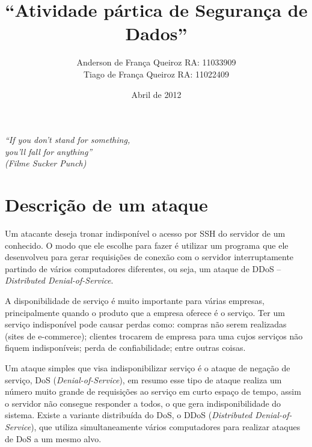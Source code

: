 \documentclass[12pt]{abnt}
\title{``Atividade pártica de Segurança de Dados''}
\author{Anderson de França Queiroz RA: 11033909\\
Tiago de França Queiroz RA: 11022409}
\date{Abril de 2012}
\begin{document}
\sloppy

\maketitle

\begin{titlepage}

  \vspace{6cm}

  \begin{flushleft}
    \sffamily\slshape
    ``If you don't stand for something,\\
	you'll fall for anything''\\
	(Filme Sucker Punch)
   
    \vspace{1cm}
    
    \end{flushleft}

\end{titlepage}

\tableofcontents
\clearpage

\chapter{Descrição de um ataque}

Um atacante deseja tronar indisponível o acesso por SSH do servidor de um conhecido. O modo que ele escolhe para fazer é utilizar
um programa que ele desenvolveu para gerar requisições de conexão com o servidor interruptamente partindo de vários computadores
diferentes, ou seja, um ataque de DDoS -- \textit{Distributed Denial-of-Service}.


A disponibilidade de serviço é muito importante para várias empresas, principalmente quando o produto que a empresa oferece é o serviço.
Ter um serviço indisponível pode causar perdas como: compras não serem realizadas (sites de e-commerce); clientes trocarem de empresa para uma cujos
serviços não fiquem indisponíveis; perda de confiabilidade; entre outras coisas.

Um ataque simples
que visa indisponibilizar serviço é o ataque de negação de serviço, DoS (\textit{Denial-of-Service}), 
em resumo esse tipo de ataque realiza um número muito grande
de requisições ao serviço em curto espaço de tempo, assim o servidor não consegue responder a todos, o que gera indisponibilidade do sistema.
Existe a variante distribuída do DoS, o DDoS (\textit{Distributed Denial-of-Service}), 
que utiliza simultaneamente vários computadores para realizar ataques de DoS a um mesmo alvo.
\end{document}
